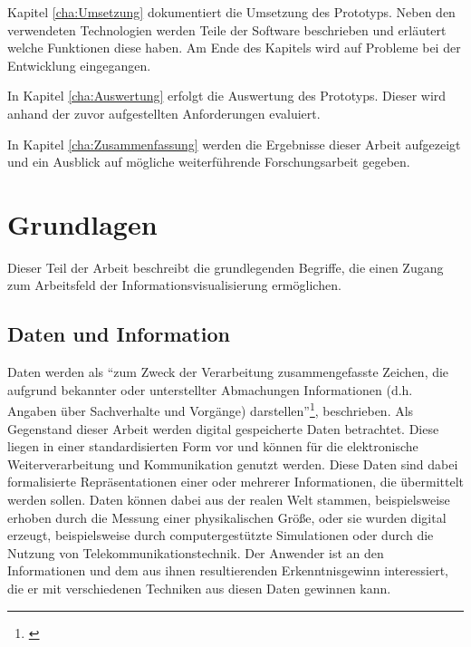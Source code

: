 \documentclass[a4paper, 
               12pt,
               DIV=calc,
               version=first,
               pdftex,
               headsepline,
               footsepline,
               bibtotocnumbered,
               liststotocnumbered]{scrreprt}
\begin{document}
Kapitel \ref{cha:Umsetzung} dokumentiert die Umsetzung des Prototyps. Neben den verwendeten
Technologien werden Teile der Software beschrieben und erläutert welche Funktionen diese haben.
Am Ende des Kapitels wird auf Probleme bei der Entwicklung eingegangen.

In Kapitel \ref{cha:Auswertung} erfolgt die Auswertung des Prototyps. Dieser wird anhand der zuvor
aufgestellten Anforderungen evaluiert.

In Kapitel \ref{cha:Zusammenfassung} werden die Ergebnisse dieser Arbeit aufgezeigt und ein
Ausblick auf mögliche weiterführende Forschungsarbeit gegeben.

\chapter{Grundlagen}
\label{cha:Grundlagen}
Dieser Teil der Arbeit beschreibt die grundlegenden Begriffe, die einen Zugang
zum Arbeitsfeld der Informationsvisualisierung ermöglichen.
\section{Daten und Information}
\label{sec:DatenInfo}
Daten werden als "`zum Zweck der Verarbeitung zusammengefasste Zeichen,
die aufgrund bekannter oder unterstellter Abmachungen
Informationen (d.h. Angaben über Sachverhalte und Vorgänge) darstellen"'\footnote{\citep{Gabler}}, beschrieben.
Als Gegenstand dieser Arbeit werden digital gespeicherte Daten betrachtet.
Diese liegen in einer standardisierten Form vor und können für die elektronische Weiterverarbeitung
und Kommunikation genutzt werden. Diese Daten sind dabei formalisierte Repräsentationen einer
oder mehrerer Informationen, die übermittelt werden sollen.
Daten können dabei aus der realen Welt stammen, beispielsweise erhoben durch
die Messung einer physikalischen Größe, oder sie wurden digital erzeugt, beispielsweise durch
computergestützte Simulationen oder durch die Nutzung von Telekommunikationstechnik.
Der Anwender ist an den Informationen und dem aus ihnen resultierenden Erkenntnisgewinn interessiert, die er mit verschiedenen
Techniken aus diesen Daten gewinnen kann.
\end{document}
